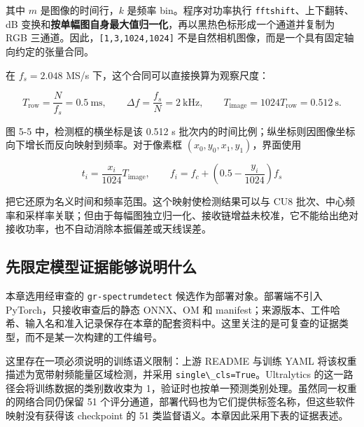 其中 \(m\) 是图像的时间行，\(k\) 是频率 bin。程序对功率执行
\passthrough{\lstinline!fftshift!}、上下翻转、dB
变换和\textbf{按单幅图自身最大值归一化}，再以黑热色标形成一个通道并复制为
RGB 三通道。因此，\passthrough{\lstinline![1,3,1024,1024]!}
不是自然相机图像，而是一个具有固定轴向约定的张量合同。

在 \(f_s=2.048\) MS/s 下，这个合同可以直接换算为观察尺度：

\[
T_{\mathrm{row}}=\frac{N}{f_s}=0.5\ \mathrm{ms},\qquad
\Delta f=\frac{f_s}{N}=2\ \mathrm{kHz},\qquad
T_{\mathrm{image}}=1024T_{\mathrm{row}}=0.512\ \mathrm{s}.
\]

图 5-5 中，检测框的横坐标是该 0.512 s
批次内的时间比例；纵坐标则因图像坐标向下增长而反向映射到频率。对于像素框
\((x_0,y_0,x_1,y_1)\)，界面使用

\[
t_i=\frac{x_i}{1024}T_{\mathrm{image}},\qquad
f_i=f_c+\left(0.5-\frac{y_i}{1024}\right)f_s
\]

把它还原为名义时间和频率范围。这个映射使检测结果可以与 CU8
批次、中心频率和采样率关联；但由于每幅图独立归一化、接收链增益未校准，它不能给出绝对接收功率，也不自动消除本振偏差或天线误差。

\subsection{先限定模型证据能够说明什么}\label{src-experiment-case5-model-evidence}

本章选用经审查的 \passthrough{\lstinline!gr-spectrumdetect!}
候选作为部署对象。部署端不引入 PyTorch，只接收审查后的静态 ONNX、OM 和
manifest；来源版本、工件哈希、输入名和准入记录保存在本章的配套资料中。这里关注的是可复查的证据类型，而不是某一次构建的工件编号。

这里存在一项必须说明的训练语义限制：上游 README 与训练 YAML
将该权重描述为宽带射频能量区域检测，并采用
\passthrough{\lstinline!single\_cls=True!}。Ultralytics
的这一路径会将训练数据的类别数收束为
1，验证时也按单一预测类别处理。虽然同一权重的网络合同仍保留 51
个评分通道，部署代码也为它们提供标签名称，但这些软件映射没有获得该
checkpoint 的 51 类监督语义。本章因此采用下表的证据表述。

